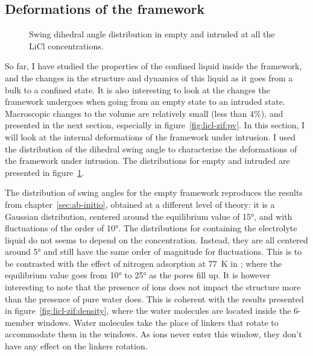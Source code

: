 \documentclass[thesis]{subfiles}
\begin{document}
\subsection{Deformations of the framework}
\label{sec:licl-zifdeformation}

\begin{figure}[ht]
    \centering
    
    \caption{Swing dihedral angle distribution in empty and intruded  at
    all the LiCl concentrations.}
    \label{fig:licl-zif:dihedrals}
\end{figure}

So far, I have studied the properties of the confined liquid inside the 
framework, and the changes in the structure and dynamics of this liquid as it
goes from a bulk to a confined state. It is also interesting to look at the
changes the framework undergoes when going from an empty state to an intruded
state. Macroscopic changes to the volume are relatively small (less than 4\%),
and presented in the next section, especially in figure~\ref{fig:licl-zif:pv}.
In this section, I will look at the internal deformations of the framework
under intrusion. I used the distribution of the  dihedral swing
angle to characterize the deformations of the framework under intrusion. The
distributions for empty and intruded  are presented in
figure~\ref{fig:licl-zif:dihedrals}.

The distribution of swing angles for the empty framework reproduces the results
from chapter~\ref{sec:ab-initio}, obtained at a different level of theory: it is
a Gaussian distribution, centered around the equilibrium value of 15°, and with
fluctuations of the order of 10°. The distributions for  containing the
electrolyte liquid do not seems to depend on the concentration. Instead, they
are all centered around 5° and still have the same order of magnitude for
fluctuations. This is to be contrasted with the effect of nitrogen adsorption at
\SI{77}{K} in ; where the equilibrium value goes from 10° to 25° as the
pores fill up. It is however interesting to note that the presence of ions does
not impact the structure more than the presence of pure water does. This is
coherent with the results presented in figure~\ref{fig:licl-zif:density}, where
the water molecules are located inside the 6-member windows. Water molecules
take the place of linkers that rotate to accommodate them in the windows. As
ions never enter this window, they don't have any effect on the linkers
rotation.
\end{document}
